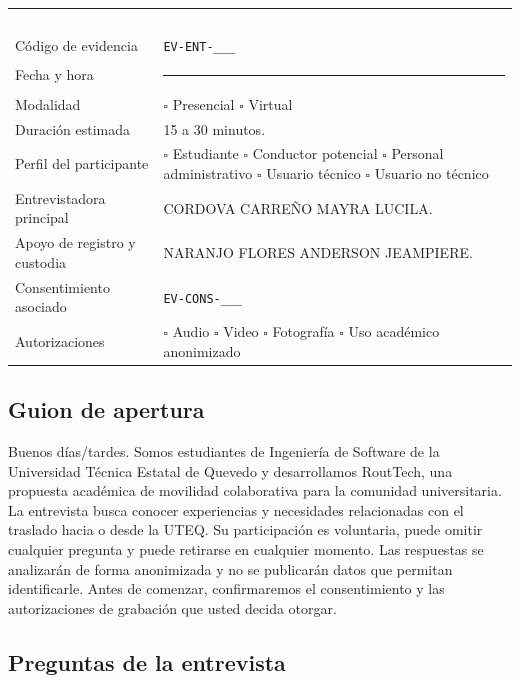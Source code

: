 \documentclass[10pt,a4paper]{article}
\newcommand{\Anderson}{NARANJO FLORES ANDERSON JEAMPIERE}
\newcommand{\Mayra}{CORDOVA CARREÑO MAYRA LUCILA}
\begin{document}
\noindent\begin{tabularx}{\textwidth}{L{4.4cm} J}
\textcolor{white}{\textbf{Dato}} & \textcolor{white}{\textbf{Registro}}\\
Código de evidencia & \texttt{EV-ENT-\_\_\_}\\
Fecha y hora & \rule{4.5cm}{0.4pt}\\
Modalidad & $\square$ Presencial \quad $\square$ Virtual\\
Duración estimada & 15 a 30 minutos.\\
Perfil del participante & $\square$ Estudiante \quad $\square$ Conductor potencial \quad $\square$ Personal administrativo \quad $\square$ Usuario técnico \quad $\square$ Usuario no técnico\\
Entrevistadora principal & \Mayra.\\
Apoyo de registro y custodia & \Anderson.\\
Consentimiento asociado & \texttt{EV-CONS-\_\_\_}\\
Autorizaciones & $\square$ Audio \quad $\square$ Video \quad $\square$ Fotografía \quad $\square$ Uso académico anonimizado\\
\end{tabularx}

\subsection{Guion de apertura}

\begin{InfoBox}
Buenos días/tardes. Somos estudiantes de Ingeniería de Software de la Universidad Técnica Estatal de Quevedo y desarrollamos RoutTech, una propuesta académica de movilidad colaborativa para la comunidad universitaria. La entrevista busca conocer experiencias y necesidades relacionadas con el traslado hacia o desde la UTEQ. Su participación es voluntaria, puede omitir cualquier pregunta y puede retirarse en cualquier momento. Las respuestas se analizarán de forma anonimizada y no se publicarán datos que permitan identificarle. Antes de comenzar, confirmaremos el consentimiento y las autorizaciones de grabación que usted decida otorgar.
\end{InfoBox}

\subsection{Preguntas de la entrevista}
\end{document}
